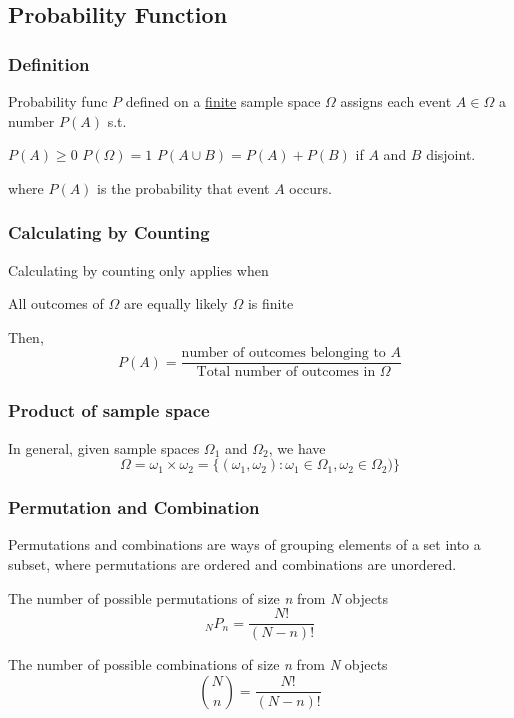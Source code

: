 \documentclass{article}
\begin{document}
\subsection{Probability Function}
\subsubsection{Definition}
\begin{definition}
Probability func $P$ defined on a \underline{finite} sample space $\Omega$ assigns each event $A \in \Omega$ a number $P(A)$ s.t.
\begin{outline}[enumerate]
\1 $P(A)\geq 0$
\1 $P(\Omega) = 1$
\1 $P(A \cup B) = P(A) + P(B)$
\2 if $A$ and $B$ disjoint.
\end{outline}
where $P(A)$ is the probability that event $A$ occurs.
\end{definition}
\subsubsection{Calculating by Counting}
Calculating by counting only applies when
\begin{outline}[enumerate]
\1 All outcomes of $\Omega$ are equally likely
\2 $\Omega$ is finite
\end{outline}
Then,
$$P(A) = \frac{\text{number of outcomes belonging to } A}{\text{ Total number of outcomes in }\Omega}$$
%


\subsubsection{Product of sample space}
In general, given sample spaces $\Omega_1$ and $\Omega_2$, we have $$\Omega = \omega_1 \times \omega_2 = \{(\omega_1, \omega_2): \omega_1 \in \Omega_1, \omega_2 \in \Omega_2)\}$$
\subsubsection{Permutation and Combination}
Permutations and combinations are ways of grouping elements of a set into a subset, where permutations are ordered and combinations are unordered.
\begin{theorem}
The number of possible permutations of size \emph{n} from \emph{N} objects
$$_NP_n = \frac{N!}{(N-n)!}$$
\end{theorem}
\begin{theorem}
The number of possible combinations of size \emph{n} from \emph{N} objects
$${N \choose n} = \frac{N!}{(N-n)!}$$
\end{theorem}
\newpage
\end{document}
